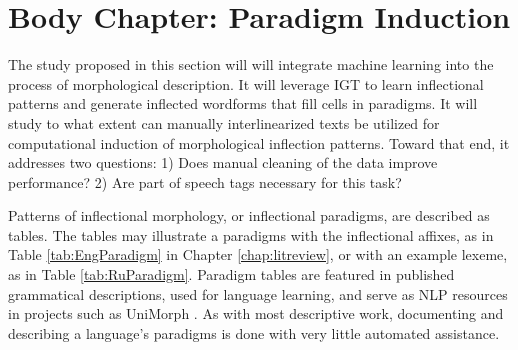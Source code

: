 \section{Body Chapter: Paradigm Induction}
\label{sec:inflection}

The study proposed in this section will will integrate machine learning into the process of morphological description. It will leverage IGT to learn inflectional patterns and generate inflected wordforms that fill cells in paradigms. It will study to what extent can manually interlinearized texts be utilized for computational induction of morphological inflection patterns. Toward that end, it addresses two questions: 1) Does manual cleaning of the data improve performance? 2)  Are part of speech tags necessary for this task?

Patterns of inflectional morphology, or inflectional paradigms, are described as tables. The tables may illustrate a paradigms with the inflectional affixes, as in Table \ref{tab:EngParadigm} in Chapter \ref{chap:litreview}, or with an example lexeme, as in Table \ref{tab:RuParadigm}. Paradigm tables are featured in published grammatical descriptions, used for language learning, and serve as NLP resources in projects such as UniMorph \citep{kirov_unimorph}. 
As with most descriptive work, documenting and describing a language's paradigms is done with very little automated assistance. 

